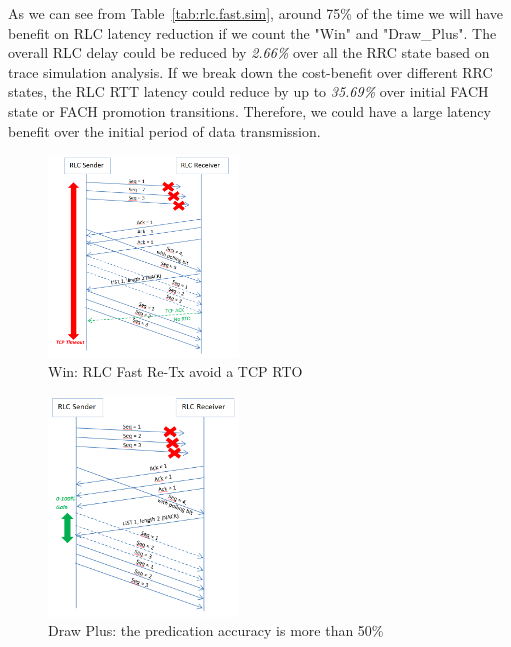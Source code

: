 As we can see from Table~\ref{tab:rlc.fast.sim}, around 75\% of the time we will have benefit on RLC latency reduction if we count the "Win" and "Draw\_{}Plus". The overall RLC delay could be reduced by \textit{2.66\%} over all the RRC state based on trace simulation analysis. If we break down the cost-benefit over different RRC states, the RLC RTT latency could reduce by up to \textit{35.69\%} over initial FACH state or FACH promotion transitions. Therefore, we could have a large latency benefit over the initial period of data transmission.


\begin{figure}
\centering
\includegraphics[width=0.45\textwidth]{figs/Win.png}
\caption{Win: RLC Fast Re-Tx avoid a TCP RTO}
\label{fig:win}
\end{figure}

\begin{figure}
\centering
\includegraphics[width=0.45\textwidth]{figs/Draw_plus.png}
\caption{Draw Plus: the predication accuracy is more than 50\%}
\label{fig:draw.plus}
\end{figure}

